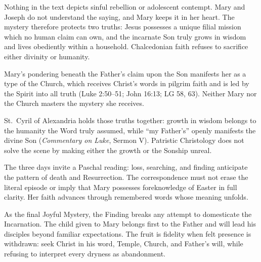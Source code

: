 Nothing in the text depicts sinful rebellion or adolescent contempt. Mary and Joseph do not understand the saying, and Mary keeps it in her heart. The mystery therefore protects two truths: Jesus possesses a unique filial mission which no human claim can own, and the incarnate Son truly grows in wisdom and lives obediently within a household. Chalcedonian faith refuses to sacrifice either divinity or humanity.

Mary's pondering beneath the Father's claim upon the Son manifests her as a type of the Church, which receives Christ's words in pilgrim faith and is led by the Spirit into all truth (Luke 2:50--51; John 16:13; LG 58, 63). Neither Mary nor the Church masters the mystery she receives.

St.~Cyril of Alexandria holds those truths together: growth in wisdom belongs to the humanity the Word truly assumed, while ``my Father's'' openly manifests the divine Son (\emph{Commentary on Luke}, Sermon V). Patristic Christology does not solve the scene by making either the growth or the Sonship unreal.

The three days invite a Paschal reading: loss, searching, and finding anticipate the pattern of death and Resurrection. The correspondence must not erase the literal episode or imply that Mary possesses foreknowledge of Easter in full clarity. Her faith advances through remembered words whose meaning unfolds.

As the final Joyful Mystery, the Finding breaks any attempt to domesticate the Incarnation. The child given to Mary belongs first to the Father and will lead his disciples beyond familiar expectations. The fruit is fidelity when felt presence is withdrawn: seek Christ in his word, Temple, Church, and Father's will, while refusing to interpret every dryness as abandonment.
